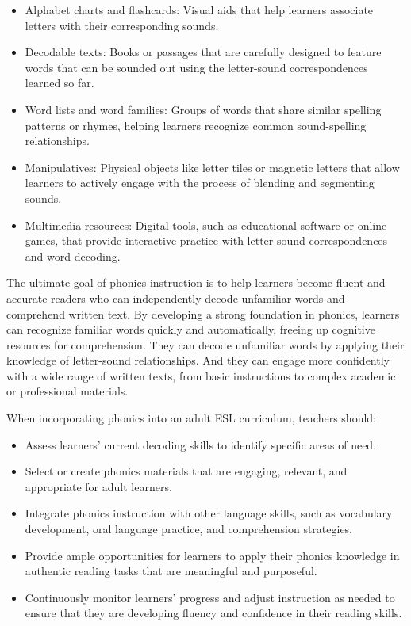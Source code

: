 \begin{itemize}[noitemsep]
    \item Alphabet charts and flashcards: Visual aids that help learners associate letters with their corresponding sounds.
    \item Decodable texts: Books or passages that are carefully designed to feature words that can be sounded out using the letter-sound correspondences learned so far.
    \item Word lists and word families: Groups of words that share similar spelling patterns or rhymes, helping learners recognize common sound-spelling relationships.
    \item Manipulatives: Physical objects like letter tiles or magnetic letters that allow learners to actively engage with the process of blending and segmenting sounds.
    \item Multimedia resources: Digital tools, such as educational software or online games, that provide interactive practice with letter-sound correspondences and word decoding.
\end{itemize}

The ultimate goal of phonics instruction is to help learners become fluent and accurate readers who can independently decode unfamiliar words and comprehend written text. By developing a strong foundation in phonics, learners can recognize familiar words quickly and automatically, freeing up cognitive resources for comprehension. They can decode unfamiliar words by applying their knowledge of letter-sound relationships. And they can engage more confidently with a wide range of written texts, from basic instructions to complex academic or professional materials.

When incorporating phonics into an adult ESL curriculum, teachers should:

\begin{itemize}[noitemsep]
    \item Assess learners' current decoding skills to identify specific areas of need.
    \item Select or create phonics materials that are engaging, relevant, and appropriate for adult learners.
    \item Integrate phonics instruction with other language skills, such as vocabulary development, oral language practice, and comprehension strategies.
    \item Provide ample opportunities for learners to apply their phonics knowledge in authentic reading tasks that are meaningful and purposeful.
    \item Continuously monitor learners' progress and adjust instruction as needed to ensure that they are developing fluency and confidence in their reading skills.
\end{itemize}

